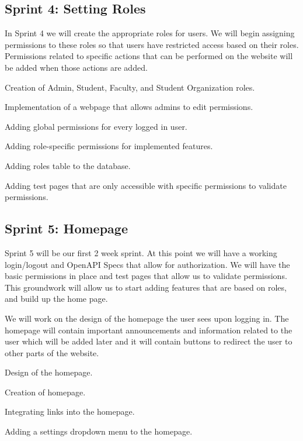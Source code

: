 \subsection {Sprint 4: Setting Roles}
In Sprint 4 we will create the appropriate roles for users. We will begin assigning permissions to these roles so that users have restricted access based on their roles. Permissions related to specific actions that can be performed on the website will be added when those actions are added.
	\begin{todolist}[leftmargin=3\parindent]
		\item Creation of Admin, Student, Faculty, and Student Organization roles.
		\item Implementation of a webpage that allows admins to edit permissions. 
		\item Adding global permissions for every logged in user.
		\item Adding role-specific permissions for implemented features.
		\item Adding roles table to the database.
		\item Adding test pages that are only accessible with specific permissions to validate permissions.
	\end{todolist}

\subsection {Sprint 5: Homepage}
Sprint 5 will be our first 2 week sprint.
At this point we will have a working login/logout and OpenAPI Specs that allow for authorization.
We will have the basic permissions in place and test pages that allow us to validate permissions.
This groundwork will allow us to start adding features that are based on roles, and build up the home page.

We will work on the design of the homepage the user sees upon logging in. The homepage will contain important announcements and information related to the user which will be added later and it will contain buttons to redirect the user to other parts of the website.
	\begin{todolist}[leftmargin=3\parindent]
		\item Design of the homepage.
		\item Creation of homepage.
		\item Integrating links into the homepage.
		\item Adding a settings dropdown menu to the homepage.
	\end{todolist}

